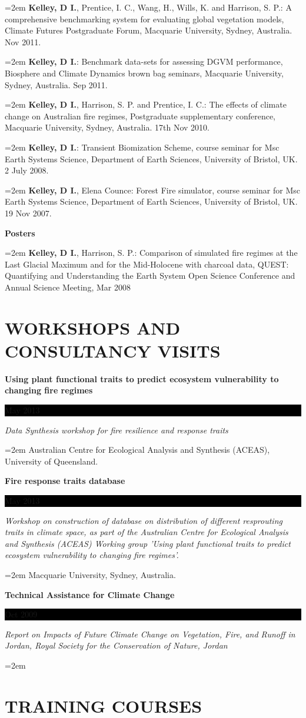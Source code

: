 \documentclass[paper=a4,fontsize=11pt]{scrartcl}	 			%
\newcommand{\sepspace}{\vspace*{1em}}			%
\newcommand{\NewPart}[1]{\section*{\uppercase{#1}}}
\newcommand{\EducationEntry}[4]{
		\noindent \textbf{#1} \hfill 					%
		\colorbox{Black}{%
			\parbox{6.5em}{%
			\hfill\color{White}#2}} \par				%
		\noindent \textit{#3} \par					%
		\noindent\hangindent=2em\hangafter=0 \small #4 	%
		\normalsize \par}
\newcommand{\BibEntry}[2]{
		\noindent \textbf{#1} \hfill \par					%
		\noindent\hangindent=2em\hangafter=0 \small #2 	%
		\normalsize \par}
\begin{document}
\BibEntry{} {\textbf{Kelley, D I.}, Prentice, I. C., Wang, H., Wills, K. and Harrison, S. P.: A comprehensive benchmarking system for evaluating global vegetation models, Climate Futures Postgraduate Forum, Macquarie University, Sydney, Australia. Nov 2011.}


\BibEntry{} {\textbf{Kelley, D I.}: Benchmark data-sets for assessing DGVM performance, Biosphere and Climate Dynamics brown bag seminars, Macquarie University, Sydney, Australia. Sep 2011.}
\BibEntry{} {\textbf{Kelley, D I.}, Harrison, S. P. and Prentice, I. C.: The effects of climate change on Australian fire regimes, Postgraduate supplementary conference, Macquarie University, Sydney, Australia. 17th Nov 2010.}

\BibEntry{} {\textbf{Kelley, D I.}: Transient Biomization Scheme, course seminar for Msc Earth Systems Science, Department of Earth Sciences, University of Bristol, UK. 2 July 2008.}

\BibEntry{} {\textbf{Kelley, D I.}, Elena Counce: Forest Fire simulator, course seminar for Msc Earth Systems Science, Department of Earth Sciences, University of Bristol, UK. 19 Nov 2007.}
\sepspace

\BibEntry{Posters} {\textbf{Kelley, D I.}, Harrison, S. P.: Comparison of simulated fire regimes at the Last Glacial Maximum and for the Mid-Holocene with charcoal data, QUEST: Quantifying and Understanding the Earth System Open Science Conference and Annual Science Meeting, Mar 2008}

\NewPart{Workshops and Consultancy Visits}
\EducationEntry{Using plant functional traits to predict ecosystem vulnerability to changing fire regimes}{May 2013} {Data Synthesis workshop for fire resilience and response traits}{Australian Centre for Ecological Analysis and Synthesis (ACEAS), University of Queensland.}
\sepspace
\pagebreak
\EducationEntry{Fire response traits database}{May 2013} {Workshop on construction of database on distribution of different resprouting traits in climate space, as part of the Australian Centre for Ecological Analysis and Synthesis (ACEAS) Working group 'Using plant functional traits to predict ecosystem vulnerability to changing fire regimes'.}{Macquarie University, Sydney, Australia.}
\sepspace

\EducationEntry{Technical Assistance for Climate Change}{Oct 2009} {Report on Impacts of Future Climate Change on Vegetation, Fire, and Runoff in Jordan, Royal Society for the Conservation of Nature, Jordan}
\sepspace

\NewPart{Training Courses}
\end{document}
